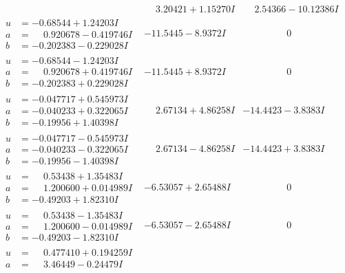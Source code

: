 \documentclass[1p]{elsarticle_modified}
\theoremstyle{definition}
\begin{document}
$$\begin{array}{c|c|c}
 & \phantom{-}3.20421 + 1.15270 I & \phantom{-}2.54366 - 10.12386 I \\ \hline\begin{aligned}
u &= -0.68544 + 1.24203 I \\
a &= \phantom{-}0.920678 - 0.419746 I \\
b &= -0.202383 - 0.229028 I\end{aligned}
 & -11.5445 - 8.9372 I & \phantom{-0.000000 } 0 \\ \hline\begin{aligned}
u &= -0.68544 - 1.24203 I \\
a &= \phantom{-}0.920678 + 0.419746 I \\
b &= -0.202383 + 0.229028 I\end{aligned}
 & -11.5445 + 8.9372 I & \phantom{-0.000000 } 0 \\ \hline\begin{aligned}
u &= -0.047717 + 0.545973 I \\
a &= -0.040233 + 0.322065 I \\
b &= -0.19956 + 1.40398 I\end{aligned}
 & \phantom{-}2.67134 + 4.86258 I & -14.4423 - 3.8383 I \\ \hline\begin{aligned}
u &= -0.047717 - 0.545973 I \\
a &= -0.040233 - 0.322065 I \\
b &= -0.19956 - 1.40398 I\end{aligned}
 & \phantom{-}2.67134 - 4.86258 I & -14.4423 + 3.8383 I \\ \hline\begin{aligned}
u &= \phantom{-}0.53438 + 1.35483 I \\
a &= \phantom{-}1.200600 + 0.014989 I \\
b &= -0.49203 + 1.82310 I\end{aligned}
 & -6.53057 + 2.65488 I & \phantom{-0.000000 } 0 \\ \hline\begin{aligned}
u &= \phantom{-}0.53438 - 1.35483 I \\
a &= \phantom{-}1.200600 - 0.014989 I \\
b &= -0.49203 - 1.82310 I\end{aligned}
 & -6.53057 - 2.65488 I & \phantom{-0.000000 } 0 \\ \hline\begin{aligned}
u &= \phantom{-}0.477410 + 0.194259 I \\
a &= \phantom{-}3.46449 - 0.24479 I \\

\end{aligned}
\end{array}$$
\end{document}
